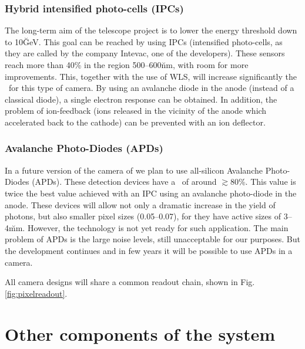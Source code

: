 \subsubsection{Hybrid intensified photo-cells (IPCs)}
%
The long-term aim of the telescope project is to lower the energy
threshold down to 10\u{GeV}.  This goal can be reached by using IPCs
(intensified photo-cells, as they are called by the company Intevac,
one of the developers). These sensors reach more than 40\% \QE in the
region 500--600\u{nm}, with room for more improvements. This, together
with the use of WLS, will increase significantly the \QEeff\ for this
type of camera. By using an avalanche diode in the anode (instead of a
classical diode), a single electron response can be obtained. In
addition, the problem of ion-feedback (ions released in the vicinity
of the anode which accelerated back to the cathode) can be prevented
with an ion deflector.

\subsubsection{Avalanche Photo-Diodes (APDs)}
%
In a future version of the camera of \MAGIC we plan to use all-silicon
Avalanche Photo-Diodes (APDs). These detection devices have a \QEeff\ 
of around $\gtrsim$80\%.  This value is twice the best value achieved
with an IPC using an avalanche photo-diode in the anode. These devices
will allow not only a dramatic increase in the yield of \Cherenkov
photons, but also smaller pixel sizes (0.05\deg--0.07\deg), for they
have active sizes of 3--4\u{mm}. However, the technology is not yet
ready for such application.  The main problem of APDs is the large
noise levels, still unacceptable for our purposes. But the development
continues and in few years it will be possible to use APDs in a \MAGIC
camera.

\bigskip

All camera designs will share a common readout chain, shown in
Fig.\ref{fig:pixelreadout}.


\section{Other components of the system}
\label{sec:othercomp}

